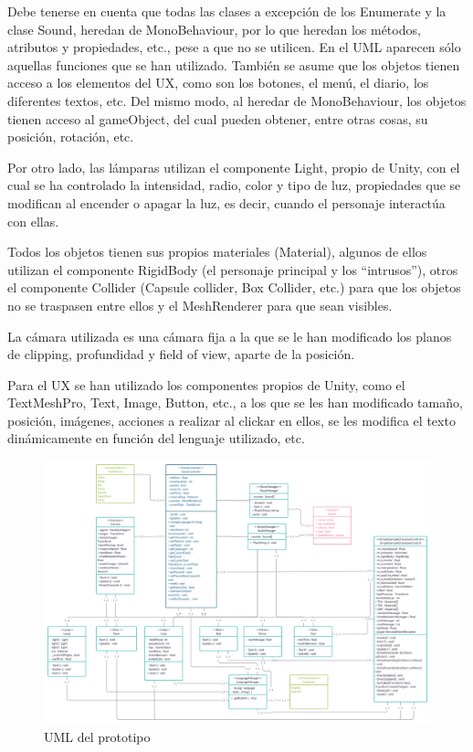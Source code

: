 \documentclass[12pt, a4paper,twoside,titlepage]{book}
\begin{document}
 Debe tenerse en cuenta que todas las clases a excepción de los Enumerate y la clase Sound, heredan de MonoBehaviour, por lo que heredan los métodos, atributos y propiedades, etc., pese a que no se utilicen. En el UML aparecen sólo aquellas funciones que se han utilizado. También se asume que los objetos tienen acceso a los elementos del UX, como son los botones, el menú, el diario, los diferentes textos, etc. Del mismo modo, al heredar de MonoBehaviour, los objetos tienen acceso al gameObject, del cual pueden obtener, entre otras cosas, su posición, rotación, etc. 

Por otro lado, las lámparas utilizan el componente Light, propio de Unity, con el cual se ha controlado la intensidad, radio, color y tipo de luz, propiedades que se modifican al encender o apagar la luz, es decir, cuando el personaje interactúa con ellas. 

Todos los objetos tienen sus propios materiales (Material), algunos de ellos utilizan el componente RigidBody (el personaje principal y los ``intrusos''), otros el componente Collider (Capsule collider, Box Collider, etc.) para que los objetos no se traspasen entre ellos y el MeshRenderer para que sean visibles.

La cámara utilizada es una cámara fija a la que se le han modificado los planos de clipping, profundidad y field of view, aparte de la posición. 

Para el UX se han utilizado los componentes propios de Unity, como el TextMeshPro, Text, Image, Button, etc., a los que se les han modificado tamaño, posición, imágenes, acciones a realizar al clickar en ellos, se les modifica el texto dinámicamente en función del lenguaje utilizado, etc. 

\begin{landscape}
\begin{figure}
    \centering
    \includegraphics[width=1\linewidth]{TGF/Extra/UML.png}
    \caption{UML del prototipo}
    \label{fig:UML}
\end{figure}
\end{landscape}
\end{document}
